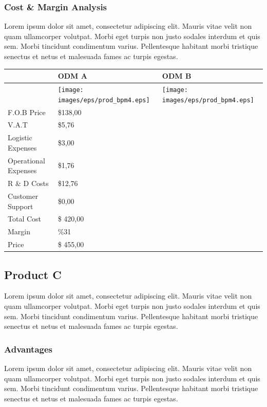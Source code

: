 \documentclass[11pt]{article}
\begin{document}
\subsubsection{Cost \& Margin Analysis}
Lorem ipsum dolor sit amet, consectetur adipiscing elit. Mauris vitae velit 
non quam ullamcorper volutpat. Morbi eget turpis non justo sodales interdum 
et quis sem. Morbi tincidunt condimentum varius. Pellentesque habitant morbi 
tristique senectus et netus et malesuada fames ac turpis egestas.\newline
\begin{tabular}{ | l | l | l | }\hline
  & ODM A & ODM B \\ \hline
  & \texttt{[image: images/eps/prod\_bpm4.eps]} & 
		\texttt{[image: images/eps/prod\_bpm4.eps]} \\ \hline
  F.O.B Price & \$138,00 &  \\ \hline
  V.A.T & \$5,76 &  \\ \hline
  Logistic Expenses & \$3,00 & \\ \hline
  Operational Expenses & \$1,76 & \\ \hline
  R \& D Costs & \$12,76 &  \\ \hline
  Customer Support & \$0,00 &  \\ \hline
  Total Cost & \$ 420,00 &  \\ \hline
  Margin & \%31 &  \\ \hline
  Price & \$ 455,00 &  \\ \hline
\end{tabular}
\pagebreak

\subsection{Product C}
Lorem ipsum dolor sit amet, consectetur adipiscing elit. Mauris vitae velit 
non quam ullamcorper volutpat. Morbi eget turpis non justo sodales interdum 
et quis sem. Morbi tincidunt condimentum varius. Pellentesque habitant morbi 
tristique senectus et netus et malesuada fames ac turpis egestas.\newline
\subsubsection{Advantages}
Lorem ipsum dolor sit amet, consectetur adipiscing elit. Mauris vitae velit 
non quam ullamcorper volutpat. Morbi eget turpis non justo sodales interdum 
et quis sem. Morbi tincidunt condimentum varius. Pellentesque habitant morbi 
tristique senectus et netus et malesuada fames ac turpis egestas.\newline
\end{document}

